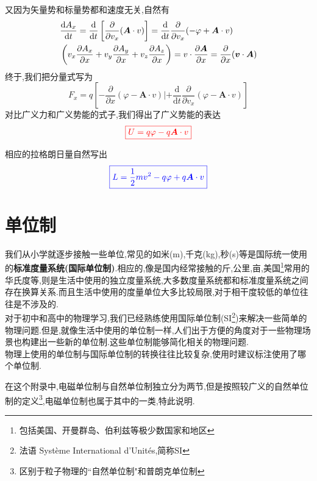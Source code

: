 又因为矢量势和标量势都和速度无关,自然有
\begin{equation}
	\begin{aligned} &\frac{\mathrm{d} A_{x}}{\mathrm{d} t}=\frac{\mathrm{d}}{\mathrm{d} t}\left[\frac{\partial}{\partial v_{x}}(\boldsymbol{A} \cdot v)\right]=\frac{\mathrm{d}}{\mathrm{d} t} \frac{\partial}{\partial v_{x}}(-\varphi+\boldsymbol{A} \cdot v)\\ &\left(v_{x} \frac{\partial A_{x}}{\partial x}+v_{y} \frac{\partial A_{y}}{\partial x}+v_{z} \frac{\partial A_{z}}{\partial x}\right)=v \cdot \frac{\partial \boldsymbol{A}}{\partial x}=\frac{\partial}{\partial x}(\boldsymbol{v} \cdot \boldsymbol{A}) \end{aligned}\\
\end{equation}
终于,我们把分量式写为
\begin{equation}
	F_{x}=q\left[-\frac{\partial}{\partial x}(\varphi-\boldsymbol{A} \cdot v) |+\frac{\mathrm{d}}{\mathrm{d} t} \frac{\partial}{\partial v_{x}}(\varphi-\boldsymbol{A} \cdot v)\right]
\end{equation}
对比广义力和广义势能的式子,我们得出了广义势能的表达
\begin{equation}
	\color{red}{\boxed{U=q \varphi-q \boldsymbol{A} \cdot v} }
\end{equation}

相应的拉格朗日量自然写出
\begin{equation}
	\color{blue}{\boxed{L=\frac{1}{2} m v^{2}-q \varphi+q \boldsymbol{A} \cdot v }}
\end{equation}





\chapter{单位制}
我们从小学就逐步接触一些单位,常见的如米(m),千克(kg),秒(s)等是国际统一使用的\textbf{标准度量系统(国际单位制)}.相应的,像是国内经常接触的斤,公里,亩,美国\footnote{包括美国、开曼群岛、伯利兹等极少数国家和地区}常用的华氏度等,则是生活中使用的独立度量系统,大多数度量系统都和标准度量系统之间存在换算关系.而且生活中使用的度量单位大多比较局限,对于相干度较低的单位往往是不涉及的.\\
对于初中和高中的物理学习,我们已经熟练使用国际单位制(SI\footnote{法语 Système International d'Unités,简称SI})来解决一些简单的物理问题.但是,就像生活中使用的单位制一样,人们出于方便的角度对于一些物理场景也构建出一些新的单位制.这些单位制能够简化相关的物理问题.\\物理上使用的单位制与国际单位制的转换往往比较复杂,使用时建议标注使用了哪个单位制.\\
\begin{remark}
	在这个附录中,电磁单位制与自然单位制独立分为两节,但是按照较广义的自然单位制的定义\footnote{区别于粒子物理的``自然单位制"和普朗克单位制},电磁单位制也属于其中的一类,特此说明.
\end{remark}
